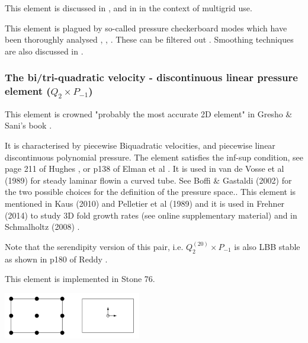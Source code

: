 This element is discussed in \cite{fort81}, \cite{fofo85} and in \cite{pisa85} 
in the context of multigrid use.

This element is plagued by so-called pressure checkerboard modes which
have been thoroughly analysed \cite{grsi94}, \cite{chpc95}, \cite{sagl81a,sagl81b}.
These can be filtered out \cite{chpc95}. Smoothing techniques are also discussed in \cite{legs79}.

\Literature \cite{fobo90}\cite{grle85}\cite{leru86}



\subsubsection{The bi/tri-quadratic velocity - discontinuous linear pressure element ($Q_2 \times P_{-1}$)}

This element is crowned "probably the most accurate 2D element" in Gresho \& Sani's book \cite{grsa}.

It is characterised by piecewise Biquadratic velocities, 
and piecewise linear discontinuous polynomial pressure. 
The element satisfies the inf-sup condition, see page 211 of Hughes \cite{hugh}, or p138 of Elman et al
\cite{elsw}.
It is used in van de Vosse et al (1989) \cite{vavs89} for steady laminar flowin a curved tube. 
See Boffi \& Gastaldi (2002) \cite{boga02} 
for the two possible choices for the definition of the pressure space..
This element is mentioned in Kaus (2010) \cite{kaus10} and Pelletier et al (1989) \cite{pefc89} 
and it is  used in Frehner (2014) \cite{freh14} to study 3D fold growth rates 
(see online supplementary material) and in Schmalholtz (2008) \cite{schm08}.

Note that the serendipity version of this pair, i.e. $Q_2^{(20)}\times P_{-1}$ is also LBB stable
as shown in p180 of Reddy \cite{reddybook2}.

This element is implemented in Stone 76. 

\begin{center}
\includegraphics[width=6cm]{images/q2pm1/q2pm1}
\end{center}


